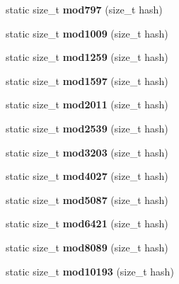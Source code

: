 \begin{DoxyCompactItemize}
\item 
static size\+\_\+t {\bfseries mod797} (size\+\_\+t hash)\label{structska_1_1prime__number__hash__policy_a7d984074338e1cf49a9eb7689cb27c96}

\item 
static size\+\_\+t {\bfseries mod1009} (size\+\_\+t hash)\label{structska_1_1prime__number__hash__policy_ab3d528eebef644012481e3a43e5e1b33}

\item 
static size\+\_\+t {\bfseries mod1259} (size\+\_\+t hash)\label{structska_1_1prime__number__hash__policy_a1535eff52bdaaeb76605c079612dd4a9}

\item 
static size\+\_\+t {\bfseries mod1597} (size\+\_\+t hash)\label{structska_1_1prime__number__hash__policy_a1e9a446fb8ee06508bf0369626bcbb1c}

\item 
static size\+\_\+t {\bfseries mod2011} (size\+\_\+t hash)\label{structska_1_1prime__number__hash__policy_a1caa651204657248b48e411268dcfb47}

\item 
static size\+\_\+t {\bfseries mod2539} (size\+\_\+t hash)\label{structska_1_1prime__number__hash__policy_a82807ddcf07933ef585fda159dfc3020}

\item 
static size\+\_\+t {\bfseries mod3203} (size\+\_\+t hash)\label{structska_1_1prime__number__hash__policy_a322d2d4cc0079540bbe46ce1d57a1d71}

\item 
static size\+\_\+t {\bfseries mod4027} (size\+\_\+t hash)\label{structska_1_1prime__number__hash__policy_acdba7984a9862983a4acb86448e94252}

\item 
static size\+\_\+t {\bfseries mod5087} (size\+\_\+t hash)\label{structska_1_1prime__number__hash__policy_a8de1e0c23833b2404d5ff1441d3db656}

\item 
static size\+\_\+t {\bfseries mod6421} (size\+\_\+t hash)\label{structska_1_1prime__number__hash__policy_a23813640b8ad7a5f32eb0bafdbd11577}

\item 
static size\+\_\+t {\bfseries mod8089} (size\+\_\+t hash)\label{structska_1_1prime__number__hash__policy_ae22353d02e9b3fdf7af2c7b7c36ce2d9}

\item 
static size\+\_\+t {\bfseries mod10193} (size\+\_\+t hash)\label{structska_1_1prime__number__hash__policy_ae1775bee48c2d6446d10871066f58c6a}


\end{DoxyCompactItemize}
